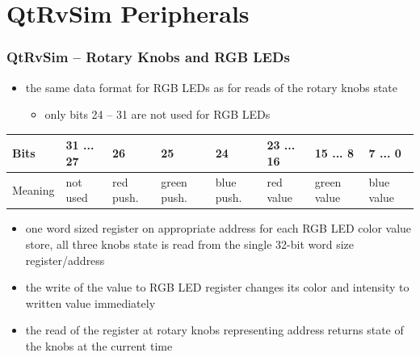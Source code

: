 \documentclass{beamer}
\begin{document}
\section{QtRvSim Peripherals}

\begin{frame}
\frametitle{QtRvSim -- Rotary Knobs and RGB LEDs}

\begin{itemize}
\item the same data format for RGB LEDs as for reads of the rotary knobs state
\begin{itemize}
\item only bits 24 -- 31 are not used for RGB LEDs
\end{itemize}
\end{itemize}

\begin{table}
\scriptsize
\begin{tabular}{|m{1.0cm}|m{1.1cm}|m{0.5cm}|m{0.5cm}|m{0.5cm}|m{1.1cm}|m{1.1cm}|m{1.1cm}|}\hline
Bits & 31 ... 27 & 26 & 25 & 24 & 23 ... 16 & 15 ... 8 & 7 ... 0 \\ \hline
Meaning & not used & red push. & green push. & blue push. & red value & green value & blue value \\ \hline
\end{tabular}
\end{table}


\begin{itemize}
\item one word sized register on appropriate address for each RGB LED color value store, all three knobs state is read from the single 32-bit word size register/address
\item the write of the value to RGB LED register changes its color and intensity to written value immediately
\item the read of the register at rotary knobs representing address returns state of the knobs at the current time
\end{itemize}

\end{frame}
\end{document}
